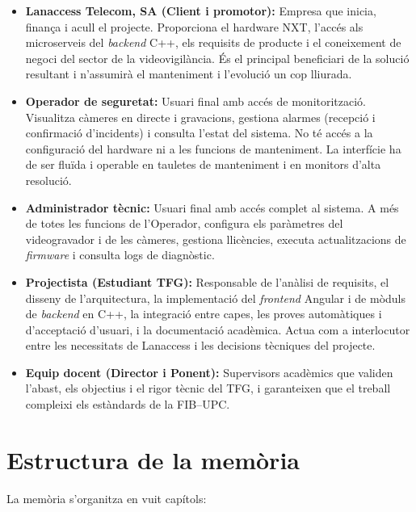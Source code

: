 \begin{itemize}
  \item \textbf{Lanaccess Telecom, SA (Client i promotor):} Empresa que inicia, finança i acull el projecte. Proporciona el hardware NXT, l'accés als microserveis del \textit{backend} C++, els requisits de producte i el coneixement de negoci del sector de la videovigilància. És el principal beneficiari de la solució resultant i n'assumirà el manteniment i l'evolució un cop lliurada.

  \item \textbf{Operador de seguretat:} Usuari final amb accés de monitorització. Visualitza càmeres en directe i gravacions, gestiona alarmes (recepció i confirmació d'incidents) i consulta l'estat del sistema. No té accés a la configuració del hardware ni a les funcions de manteniment. La interfície ha de ser fluïda i operable en tauletes de manteniment i en monitors d'alta resolució.

  \item \textbf{Administrador tècnic:} Usuari final amb accés complet al sistema. A més de totes les funcions de l'Operador, configura els paràmetres del videogravador i de les càmeres, gestiona llicències, executa actualitzacions de \textit{firmware} i consulta logs de diagnòstic.

  \item \textbf{Projectista (Estudiant TFG):} Responsable de l'anàlisi de requisits, el disseny de l'arquitectura, la implementació del \textit{frontend} Angular i de mòduls de \textit{backend} en C++, la integració entre capes, les proves automàtiques i d'acceptació d'usuari, i la documentació acadèmica. Actua com a interlocutor entre les necessitats de Lanaccess i les decisions tècniques del projecte.

  \item \textbf{Equip docent (Director i Ponent):} Supervisors acadèmics que validen l'abast, els objectius i el rigor tècnic del TFG, i garanteixen que el treball compleixi els estàndards de la FIB--UPC.
\end{itemize}

\section{Estructura de la memòria}
\label{sec:estructura}
La memòria s'organitza en vuit capítols:

